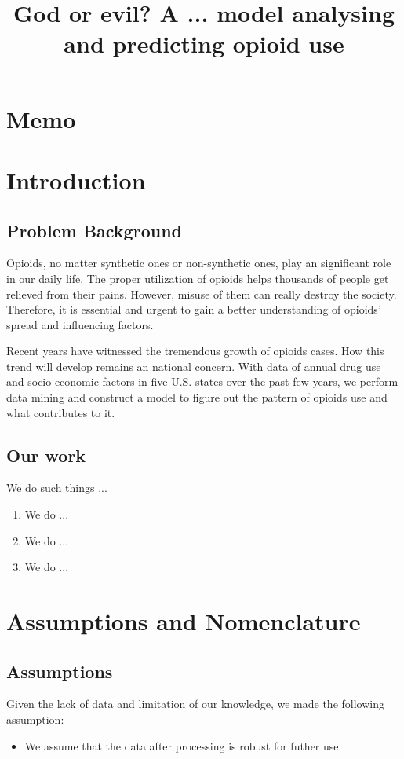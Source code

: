 \documentclass[12pt]{article}
\title{\large God or evil? A ... model analysing and predicting opioid use}  %
\newcommand{\upcite}[1]{\textsuperscript{\textsuperscript{\cite{#1}}}}
\begin{document}

\section*{Memo}
\newpage

\section{Introduction}
\subsection{Problem Background}
Opioids, no matter synthetic ones or non-synthetic ones, play an significant role in our daily life. The proper utilization of opioids helps thousands of people get relieved from their pains. However, misuse of them can really destroy the society. Therefore, it is essential and urgent to gain a better understanding of opioids' spread and influencing factors.

Recent years have witnessed the tremendous growth of opioids cases. How this trend will develop remains an national concern. With data of annual drug use and socio-economic factors in five U.S. states over the past few years, we perform data mining and construct a model to figure out the pattern of opioids use and what contributes to it.


\subsection{Our work}
We do such things ...

\begin{enumerate}[\bfseries 1.]
    \item We do ...
    \item We do ...
    \item We do ...
\end{enumerate}

\section{Assumptions and Nomenclature}
\subsection{Assumptions}
Given the lack of data and limitation of our knowledge, we made the following assumption:
\begin{itemize}
    \item We assume that the data after processing is robust for futher use.
\end{itemize}
\end{document}
